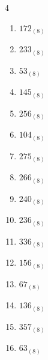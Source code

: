 \begin{multicols}{4}
\begin{enumerate}
  \item $172_{(8)}$

        \phantom{$=122$}

  \item $233_{(8)}$

        \phantom{$=155$}

  \item $53_{(8)}$

        \phantom{$=43$}

  \item $145_{(8)}$

        \phantom{$=101$}

  \item $256_{(8)}$

        \phantom{$=174$}

\columnbreak %

  \item $104_{(8)}$

        \phantom{$=68$}

  \item $275_{(8)}$

        \phantom{$=189$}

  \item $266_{(8)}$

        \phantom{$=182$}

  \item $240_{(8)}$

        \phantom{$=160$}

  \item $236_{(8)}$

        \phantom{$=158$}

  \item $336_{(8)}$

        \phantom{$=222$}

  \item $156_{(8)}$

        \phantom{$=110$}

  \item $67_{(8)}$

        \phantom{$=55$}

  \item $136_{(8)}$

        \phantom{$=94$}

  \item $357_{(8)}$

        \phantom{$=239$}

  \item $63_{(8)}$


\end{enumerate}
\end{multicols}
